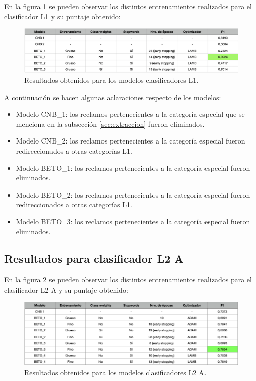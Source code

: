 En la figura \ref{fig:res-l1} se pueden observar los distintos entrenamientos realizados para el clasificador L1 y su puntaje obtenido:

\begin{figure}[htbp]
	\centering
	\includegraphics[width=1\textwidth]{./Figures/cap4-resultados-l1.png}
	\caption{Resultados obtenidos para los modelos clasificadores L1.}
	\label{fig:res-l1}
\end{figure}

A continuación se hacen algunas aclaraciones respecto de los modelos:
\begin{itemize}
	\item Modelo CNB\_1: los reclamos pertenecientes a la categoría especial que se menciona en la subsección \ref{sec:extraccion} fueron eliminados.
	\item Modelo CNB\_2: los reclamos pertenecientes a la categoría especial fueron redireccionados a otras categorías L1.
	\item Modelo BETO\_1: los reclamos pertenecientes a la categoría especial fueron eliminados.
	\item Modelo BETO\_2: los reclamos pertenecientes a la categoría especial fueron redireccionados a otras categorías L1.
	\item Modelo BETO\_3: los reclamos pertenecientes a la categoría especial fueron eliminados.
\end{itemize}

\subsection{Resultados para clasificador L2 A}

En la figura \ref{fig:res-l2a} se pueden observar los distintos entrenamientos realizados para el clasificador L2 A y su puntaje obtenido:

\begin{figure}[H]
	\centering
	\includegraphics[width=1\textwidth]{./Figures/cap4-resultados-l2a.png}
	\caption{Resultados obtenidos para los modelos clasificadores L2 A.}
	\label{fig:res-l2a}
\end{figure}

